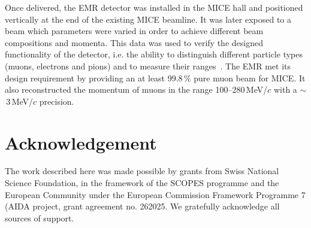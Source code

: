\documentclass[a4paper,11pt]{article}
\begin{document}
Once delivered, the EMR detector was installed in the MICE hall and positioned vertically at the end of the existing MICE beamline.
It was later exposed to a beam which parameters were varied in order to achieve different beam compositions and momenta. This data was used to verify the designed
functionality of the detector, i.e. the ability to distinguish different particle types (muons, electrons and pions) and to measure their ranges~\cite{performance}. The EMR met its design requirement by providing an at least 99.8\,\% pure muon beam for MICE. It also reconstructed the momentum of muons in the range 100--280\,MeV/$c$ with a $\sim$\,3\,MeV/$c$ precision.

\section*{Acknowledgement}
The work described here was made possible by grants from Swiss National Science Foundation, in the framework of the SCOPES programme and the European Community
under the European Commission Framework Programme 7 (AIDA project, grant agreement no. 262025. We gratefully acknowledge all sources of support.




\end{document}
